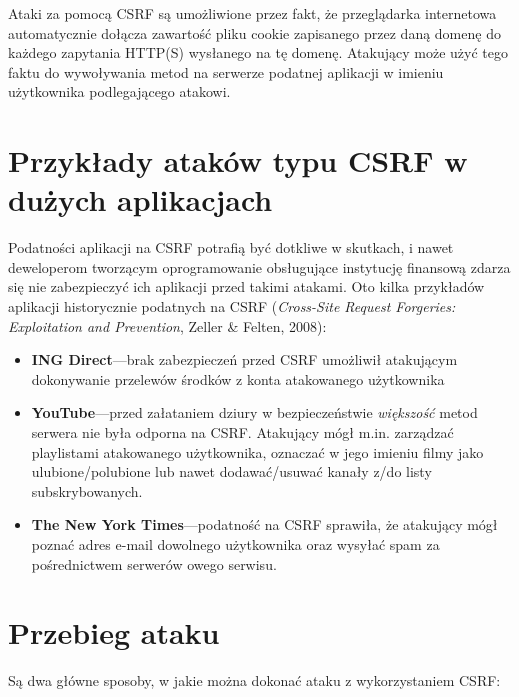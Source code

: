 \documentclass[12pt,polish,a4paper,]{report}
\providecommand{\tightlist}{%
  \setlength{\itemsep}{0pt}\setlength{\parskip}{0pt}}
\begin{document}
Ataki za pomocą CSRF są umożliwione przez fakt, że przeglądarka
internetowa automatycznie dołącza zawartość pliku cookie zapisanego
przez daną domenę do każdego zapytania HTTP(S) wysłanego na tę domenę.
Atakujący może użyć tego faktu do wywoływania metod na serwerze podatnej
aplikacji w imieniu użytkownika podlegającego atakowi.

\section{Przykłady ataków typu CSRF w dużych
aplikacjach}\label{przykux142ady-atakuxf3w-typu-csrf-w-duux17cych-aplikacjach}

Podatności aplikacji na CSRF potrafią być dotkliwe w skutkach, i nawet
deweloperom tworzącym oprogramowanie obsługujące instytucję finansową
zdarza się nie zabezpieczyć ich aplikacji przed takimi atakami. Oto
kilka przykładów aplikacji historycznie podatnych na CSRF
(\emph{Cross-Site Request Forgeries: Exploitation and Prevention},
Zeller \& Felten, 2008):

\begin{itemize}
\tightlist
\item
  \textbf{ING Direct}---brak zabezpieczeń przed CSRF umożliwił
  atakującym dokonywanie przelewów środków z konta atakowanego
  użytkownika
\item
  \textbf{YouTube}---przed załataniem dziury w bezpieczeństwie
  \emph{większość} metod serwera nie była odporna na CSRF. Atakujący
  mógł m.in. zarządzać playlistami atakowanego użytkownika, oznaczać w
  jego imieniu filmy jako ulubione/polubione lub nawet dodawać/usuwać
  kanały z/do listy subskrybowanych.
\item
  \textbf{The New York Times}---podatność na CSRF sprawiła, że atakujący
  mógł poznać adres e-mail dowolnego użytkownika oraz wysyłać spam za
  pośrednictwem serwerów owego serwisu.
\end{itemize}

\section{Przebieg ataku}\label{przebieg-ataku-3}

Są dwa główne sposoby, w jakie można dokonać ataku z wykorzystaniem
CSRF:
\end{document}
